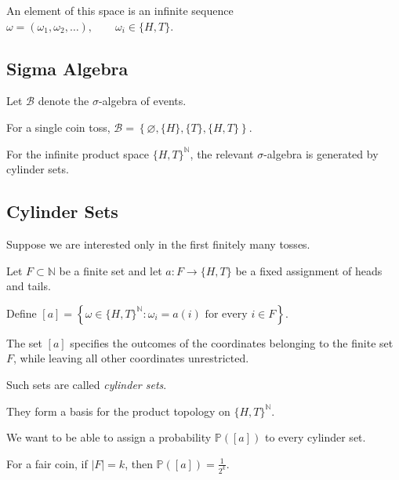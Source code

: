 An element of this space is an infinite sequence
\(
\omega=(\omega_1,\omega_2,\ldots),
\qquad
\omega_i\in\{H,T\}.
\)


\subsection{Sigma Algebra}

Let $\mathcal{B}$ denote the $\sigma$-algebra of events.

For a single coin toss,
\(
\mathcal{B}
=
\left\{
\varnothing,
\{H\},
\{T\},
\{H,T\}
\right\}.
\)

For the infinite product space
\(\{H,T\}^{\mathbb{N}}\), the relevant $\sigma$-algebra is generated
by cylinder sets.


\subsection{Cylinder Sets}

Suppose we are interested only in the first finitely many tosses.

Let
\(
F\subset\mathbb{N}
\)
be a finite set and let
\(
a:F\longrightarrow\{H,T\}
\)
be a fixed assignment of heads and tails.

Define
\(
[a]
=
\left\{
\omega\in\{H,T\}^{\mathbb{N}}
:
\omega_i=a(i)
\text{ for every }i\in F
\right\}.
\)

The set $[a]$ specifies the outcomes of the coordinates belonging to
the finite set $F$, while leaving all other coordinates unrestricted.

Such sets are called \emph{cylinder sets}.

They form a basis for the product topology on
\(
\{H,T\}^{\mathbb{N}}.
\)

We want to be able to assign a probability
\(
\mathbb{P}([a])
\)
to every cylinder set.

For a fair coin, if $|F|=k$, then
\(
\mathbb{P}([a])
=
\frac{1}{2^k}.
\)




\lectureend
